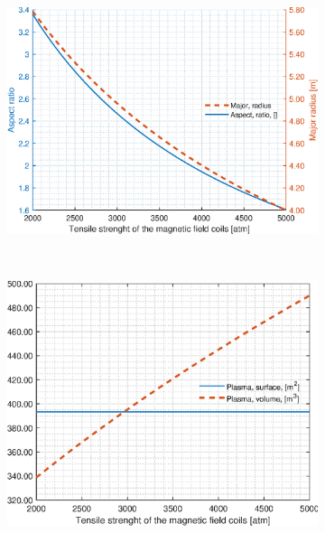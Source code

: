 \begin{figure}[H]
	\begin{subfigure}[b]{.45\textwidth}
		\includegraphics[width=\textwidth]{MatlabFigures/sigmamax/f3.eps}
	\end{subfigure}
	~
	\begin{subfigure}[b]{.45\textwidth}
		\includegraphics[width=\textwidth]{MatlabFigures/sigmamax/f4.eps}
	\end{subfigure}


\end{figure}
